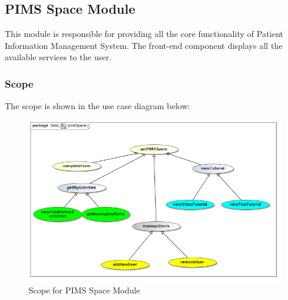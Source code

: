\subsection{PIMS Space Module}
This module is responsible for providing all the core functionality of Patient Information Management System. The front-end component displays all the available services to the user. \par 

\subsubsection{Scope}
The scope is shown in the use case diagram below: \par
		\begin{figure}[H]
			\centerline{\includegraphics[width=0.75\linewidth]{./Graphics/pimsSpace/pimsSpace}}
			\caption{Scope for PIMS Space Module}
		\end{figure}


